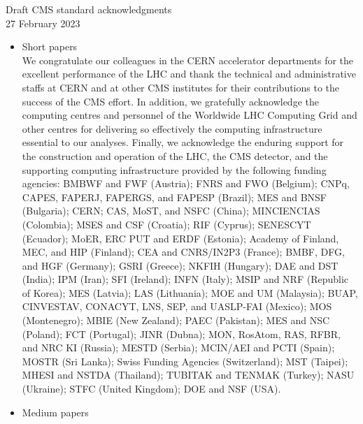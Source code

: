 \documentclass[11pt,twoside,a4paper]{cms-tdr}
\begin{document}
\begin{centering}
{Draft CMS standard acknowledgments}\\
27 February 2023\\
\end{centering}

\begin{itemize}
    \item Short papers\\
    We congratulate our colleagues in the CERN accelerator departments for the excellent performance of the LHC and thank the technical and administrative staffs at CERN and at other CMS institutes for their contributions to the success of the CMS effort. In addition, we gratefully acknowledge the computing centres and personnel of the Worldwide LHC Computing Grid and other centres for delivering so effectively the computing infrastructure essential to our analyses. Finally, we acknowledge the enduring support for the construction and operation of the LHC, the CMS detector, and the supporting computing infrastructure provided by the following funding agencies: BMBWF and FWF (Austria); FNRS and FWO (Belgium); CNPq, CAPES, FAPERJ, FAPERGS, and FAPESP (Brazil); MES and BNSF (Bulgaria); CERN; CAS, MoST, and NSFC (China); MINCIENCIAS (Colombia); MSES and CSF (Croatia); RIF (Cyprus); SENESCYT (Ecuador); MoER, ERC PUT and ERDF (Estonia); Academy of Finland, MEC, and HIP (Finland); CEA and CNRS/IN2P3 (France); BMBF, DFG, and HGF (Germany); GSRI (Greece); NKFIH (Hungary); DAE and DST (India); IPM (Iran); SFI (Ireland); INFN (Italy); MSIP and NRF (Republic of Korea); MES (Latvia); LAS (Lithuania); MOE and UM (Malaysia); BUAP, CINVESTAV, CONACYT, LNS, SEP, and UASLP-FAI (Mexico); MOS (Montenegro); MBIE (New Zealand); PAEC (Pakistan); MES and NSC (Poland); FCT (Portugal); JINR (Dubna); MON, RosAtom, RAS, RFBR, and NRC KI (Russia); MESTD (Serbia); MCIN/AEI and PCTI (Spain); MOSTR (Sri Lanka); Swiss Funding Agencies (Switzerland); MST (Taipei); MHESI and NSTDA (Thailand); TUBITAK and TENMAK (Turkey); NASU (Ukraine); STFC (United Kingdom); DOE and NSF (USA).  
    \item Medium papers\\

\end{itemize}
\end{document}
